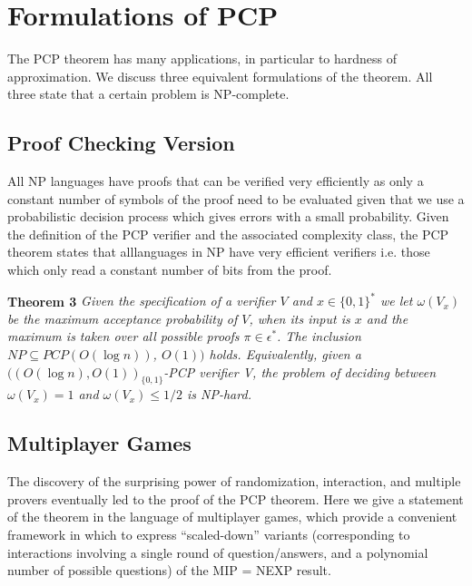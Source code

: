 
\section{Formulations of PCP}
The PCP theorem has many applications, in particular to hardness of approximation. We discuss three equivalent formulations of the theorem. All three state that a certain problem is NP-complete.

\subsection{Proof Checking Version}
All NP languages have proofs that can be verified very efficiently as only a constant number of symbols of the proof need to be evaluated given that we use a probabilistic decision process which gives errors with a small probability. Given the definition of the PCP verifier and the associated complexity class, the PCP theorem states that alllanguages in NP have very efficient verifiers i.e. those which only read a constant number of bits from the proof.

\textbf{Theorem 3} \textit{Given the specification of a verifier $V$ and $x \in \{0, 1\}^*$ we let $\omega (V_x)$ be the maximum acceptance probability of $V$, when its input is $x$ and the maximum is taken over all possible proofs $\pi \in \epsilon^*$. The inclusion $NP \subseteq PCP(O(\log n))$, $O(1))$ holds. Equivalently, given a $((O(\log n), O(1))_{\{0,1\}}$-PCP verifier V, the problem of deciding between $\omega(V_x) = 1$ and $\omega(V_x) \leq 1/2$ is NP-hard.}

\subsection{Multiplayer Games}
The discovery of the surprising power of randomization, interaction, and multiple provers eventually led to the proof of the PCP theorem. Here we give a statement of the theorem in the language of multiplayer games, which provide a convenient framework in which to express “scaled-down” variants (corresponding to interactions involving a single round of question/answers, and a polynomial number of possible questions) of the MIP = NEXP result.

